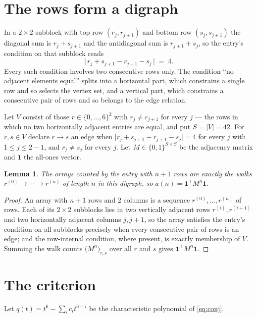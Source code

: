 \documentclass[11pt,a4paper]{article}
\theoremstyle{plain}
\newtheorem{lemma}[theorem]{Lemma}
\theoremstyle{definition}
\begin{document}
\section{The rows form a digraph}

In a $2\times2$ subblock with top row $(r_j,r_{j+1})$ and bottom row $(s_j,s_{j+1})$ the
diagonal sum is $r_j+s_{j+1}$ and the antidiagonal sum is $r_{j+1}+s_j$, so the entry's
condition on that subblock reads
\[
\bigl|\,r_j+s_{j+1}-r_{j+1}-s_j\,\bigr|\;=\;4.
\]
Every such condition involves two consecutive rows only. The condition ``no adjacent elements equal'' splits into a horizontal
part, which constrains a single row and so selects the vertex set, and a vertical part,
which constrains a consecutive pair of rows and so belongs to the edge relation.

Let $V$ consist of those $r\in\{0,\dots,6\}^{2}$ with $r_j\ne r_{j+1}$ for every
$j$ --- the rows in which no two horizontally adjacent entries are equal, and put $S=|V|=42$. For $r,s\in V$ declare $r\to s$ an edge
when $\bigl|r_j+s_{j+1}-r_{j+1}-s_j\bigr|=4$ for every $j$ with
$1\le j\le2-1$, and $r_j\ne s_j$ for every $j$. Let $M\in\{0,1\}^{S\times S}$ be the adjacency matrix and $\mathbf{1}$
the all-ones vector.

\begin{lemma}\label{lem:walk}
The arrays counted by the entry with $n+1$ rows are exactly the walks
$r^{(0)}\to\cdots\to r^{(n)}$ of length $n$ in this digraph, so
$a(n)=\mathbf{1}^{\!\top}M^{n}\mathbf{1}$.
\end{lemma}

\begin{proof}
An array with $n+1$ rows and $2$ columns is a sequence $r^{(0)},\dots,r^{(n)}$ of
rows. Each of its $2\times2$ subblocks lies in two vertically adjacent rows
$r^{(i)},r^{(i+1)}$ and two horizontally adjacent columns $j,j+1$, so the array satisfies
the entry's condition on all subblocks precisely when every consecutive pair of rows is an
edge; and the row-internal condition, where present, is exactly membership of $V$. Summing
the walk counts $\bigl(M^{n}\bigr)_{r,s}$ over all $r$ and $s$ gives
$\mathbf{1}^{\!\top}M^{n}\mathbf{1}$.
\end{proof}

\section{The criterion}

Let $q(t)=t^{6}-\sum_i c_i t^{6-i}$ be the characteristic polynomial of
\eqref{eq:conj}.
\end{document}
